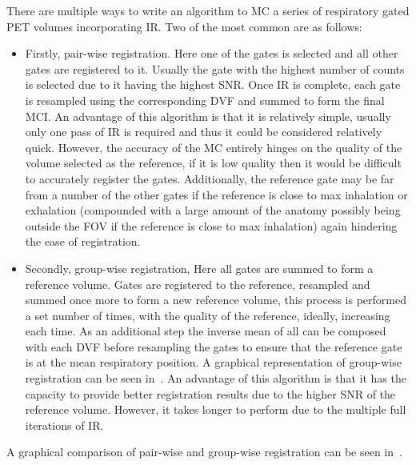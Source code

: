             There are multiple ways to write an algorithm to \gls{MC} a series of respiratory gated \gls{PET} volumes incorporating \gls{IR}. Two of the most common are as follows:
            
            \begin{itemize}
                \item Firstly, pair-wise registration. Here one of the gates is selected and all other gates are registered to it. Usually the gate with the highest number of counts is selected due to it having the highest \gls{SNR}. Once \gls{IR} is complete, each gate is resampled using the corresponding \gls{DVF} and summed to form the final \gls{MCI}. An advantage of this algorithm is that it is relatively simple, usually only one pass of \gls{IR} is required and thus it could be considered relatively quick. However, the accuracy of the \gls{MC} entirely hinges on the quality of the volume selected as the reference, if it is low quality then it would be difficult to accurately register the gates. Additionally, the reference gate may be far from a number of the other gates if the reference is close to max inhalation or exhalation (compounded with a large amount of the anatomy possibly being outside the \gls{FOV} if the reference is close to max inhalation) again hindering the ease of registration.
                
                \item Secondly, group-wise registration, Here all gates are summed to form a reference volume. Gates are registered to the reference, resampled and summed once more to form a new reference volume, this process is performed a set number of times, with the quality of the reference, ideally, increasing each time. As an additional step the inverse mean of all  can be composed with each \gls{DVF} before resampling the gates to ensure that the reference gate is at the mean respiratory position. A graphical representation of group-wise registration can be seen in~. An advantage of this algorithm is that it has the capacity to provide better registration results due to the higher \gls{SNR} of the reference volume. However, it   takes longer to perform due to the multiple full iterations of \gls{IR}.
            \end{itemize}
            
            A graphical comparison of pair-wise and group-wise registration can be seen in~.
            
